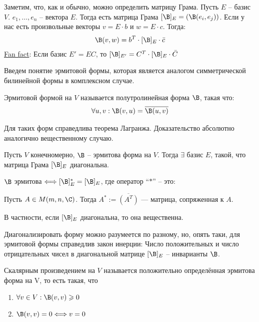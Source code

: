 Заметим, что, как и обычно, можно определить матрицу Грама. 
Пусть $E$ -- базис $V$. $e_1, \dots, e_n$ -- вектора $E$. Тогда есть матрица Грама $[\B]_E = (\B(e_i, e_j))$. 
Если у нас есть произвольные векторы $v = E \cdot b$ и $w = E \cdot c$. Тогда: 
\begin{gather*}
    \B(v, w) = b^T \cdot [\B]_E \cdot \bar{c}
\end{gather*}
\underline{Fan fact}:
Если базис $E' = EC$, то $[\B]_{E'} = C^T \cdot [\B]_{E} \cdot \bar{C}$

Введем понятие эрмитовой формы, которая является аналогом симметрической билинейной формы в комплексном случае. 
\begin{conj}
    Эрмитовой формой на $V$ называется полутролинейная форма $\B$, такая что:  
    \begin{gather*}
        \forall u, v: \B(v, u) = \overline{\B(u, v)}
    \end{gather*}
\end{conj}
Для таких форм справедлива теорема Лагранжа. Доказательство абсолютно аналогично вещественному случаю. 
\begin{theorem}
    Пусть $V$ конечномерно, $\B$ --  эрмитова форма на $V$. Тогда $\exists$ базис $E$, такой, что матрица Грама $[\B]_E$ диагональна.
\end{theorem}

\notice $\B$ эрмитова $\Longleftrightarrow [\B]^*_E  = [\B]_E$, где оператор ``$*$'' -- это: 
\begin{conj}
    Пусть $A \in M(m, n, \C)$. Тогда $A^* := \overline{(A^T)}$ --- матрица, сопряженная к $A$.
\end{conj}
В частности, если $[\B]_E$ диагональна, то она вещественна.

Диагонализировать форму можно разумеется по разному, но, опять таки, для эрмитовой формы справедлив закон инерции:
Число положительных и число отрицательных чисел в диагональной матрице $[\B]_E$ -- инварианты $\B$.

\begin{conj}
    Скалярным произведением на $V$ называется положительно определённая эрмитова форма на V, то есть такая, что
    \begin{enumerate}
        \item $\forall v \in V: \B(v, v) \geqslant 0$
        \item $\B(v, v) = 0 \Longleftrightarrow v = 0$
    \end{enumerate}
\end{conj}

